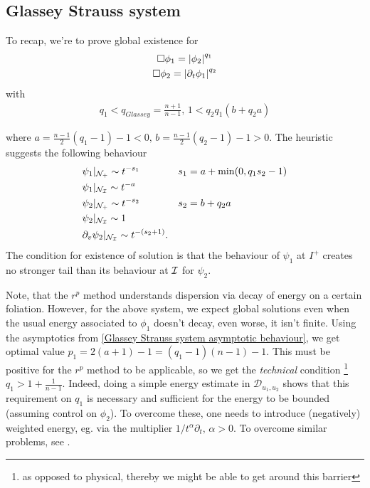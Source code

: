 \documentclass[11pt, oneside]{amsart}
\begin{document}
	\subsection{Glassey Strauss system}\label{gs gwp}
	To recap, we're to prove global existence for
	\begin{equation*}
		\begin{gathered}
			\Box\phi_1=\left\lvert \phi_2\right\rvert^{q_1}\\
			\Box\phi_2=\left\lvert \partial_t\phi_1\right\rvert^{q_2}
		\end{gathered}
	\end{equation*}
	with 
	\begin{equation}\label{gs conditions}
		\begin{gathered}
			q_1<q_{Glassey}=\frac{n+1}{n-1},\,1<q_2q_1(b+q_2a)
		\end{gathered}
	\end{equation}
	
	where $a=\frac{n-1}{2}(q_1-1)-1<0,\,b=\frac{n-1}{2}(q_2-1)-1>0$. The heuristic suggests the following behaviour
	\begin{equation}\label{Glassey Strauss system asymptotic behaviour}
		\begin{aligned}
			&\psi_1|_{\mathcal{N}_+}\sim t^{-s_1} && s_1=a+\min(0,q_1s_2-1)\\
			&\psi_1|_{\mathcal{N}_{\mathcal{I}}}\sim t^{-a}\\
			&\psi_2|_{\mathcal{N}_+}\sim t^{-s_2} && s_2=b+q_2a\\
			&\psi_2|_{\mathcal{N}_{\mathcal{I}}}\sim1\\
			&\partial_v\psi_2|_{\mathcal{N}_{\mathcal{I}}}\sim t^{-(s_2+1)}.
		\end{aligned}
	\end{equation}
	The condition for existence of solution is that the behaviour of $\psi_1$ at $I^+$ creates no stronger tail than its behaviour at $\mathcal{I}$ for $\psi_2$. 
	
	\begin{remark}
		Note, that the $r^p$ method understands dispersion via decay of energy on a certain foliation. However, for the above system, we expect global solutions even when the usual energy associated to $\phi_1$ doesn't decay, even worse, it isn't finite. Using the asymptotics from \eqref{Glassey Strauss system asymptotic behaviour}, we get optimal value $p_1=2(a+1)-1=(q_1-1)(n-1)-1$. This must be positive for the $r^p$ method to be applicable, so we get the \textit{technical} condition \footnote{as opposed to physical, thereby we might be able to get around this barrier} $q_1>1+\frac{1}{n-1}$. Indeed, doing a simple energy estimate in $\mathcal{D}_{u_1,u_2}$ shows that this requirement on $q_1$ is necessary and sufficient for the energy to be bounded (assuming control on $\phi_2$). To overcome these, one needs to introduce (negatively) weighted energy, eg. via the multiplier $1/t^\alpha\partial_t,\,\alpha>0$. To overcome similar problems, see \cite{keir_weak_2018}.
	\end{remark}
	
\end{document}
